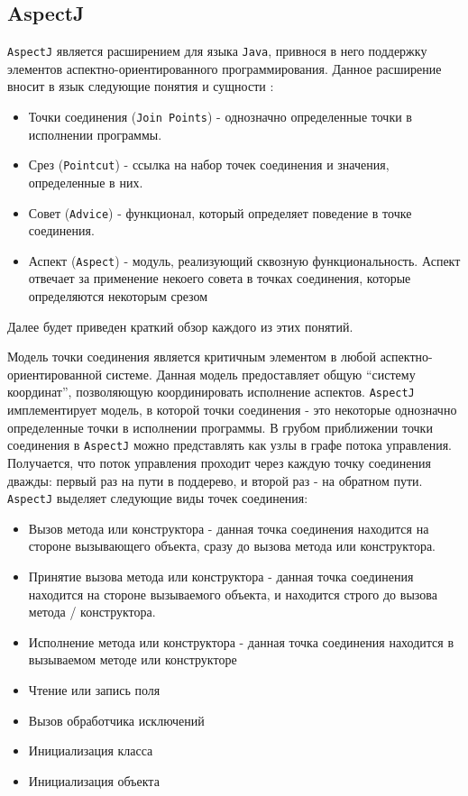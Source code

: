 \subsection{AspectJ}

\texttt{AspectJ} является расширением для языка \texttt{Java}, привнося в него поддержку элементов аспектно-ориентированного программирования. Данное расширение вносит в язык следующие понятия и сущности \cite{aspectj}:

\begin{itemize}
    \item Точки соединения (\texttt{Join~Points}) - однозначно определенные точки в исполнении программы.
    \item Срез (\texttt{Pointcut}) - ссылка на набор точек соединения и значения, определенные в них.
    \item Совет (\texttt{Advice}) - функционал, который определяет поведение в точке соединения.
    \item Аспект (\texttt{Aspect}) - модуль, реализующий сквозную функциональность. Аспект отвечает за применение некоего совета в точках соединения, которые определяются некоторым срезом
\end{itemize}

Далее будет приведен краткий обзор каждого из этих понятий.

Модель точки соединения является критичным элементом в любой аспектно-ориентированной системе. Данная модель предоставляет общую ``систему координат'', позволяющую координировать исполнение аспектов. \texttt{AspectJ} имплементирует модель, в которой точки соединения - это некоторые однозначно определенные точки в исполнении программы. В грубом приближении точки соединения в \texttt{AspectJ} можно представлять как узлы в графе потока управления. Получается, что поток управления проходит через каждую точку соединения дважды: первый раз на пути в поддерево, и второй раз - на обратном пути. \texttt{AspectJ} выделяет следующие виды точек соединения:

\begin{itemize}
    \item Вызов метода или конструктора - данная точка соединения находится на стороне вызывающего объекта, сразу до вызова метода или конструктора.
    \item Принятие вызова метода или конструктора - данная точка соединения находится на стороне вызываемого объекта, и находится строго до вызова метода / конструктора.
    \item Исполнение метода или конструктора - данная точка соединения находится в вызываемом методе или конструкторе
    \item Чтение или запись поля
    \item Вызов обработчика исключений
    \item Инициализация класса
    \item Инициализация объекта
\end{itemize}

